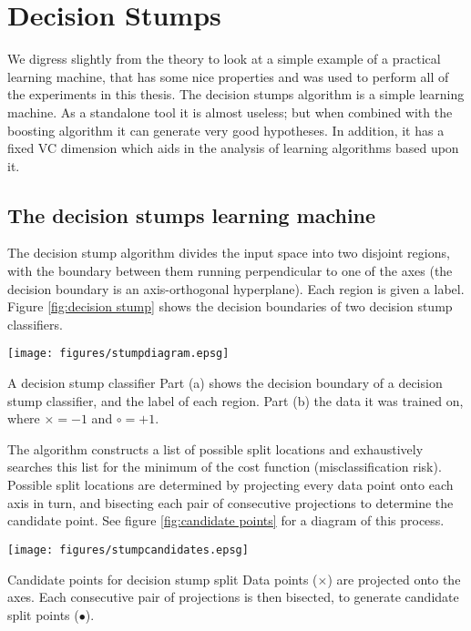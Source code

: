 
\chapter{Decision Stumps}
\label{chapter:stumps}

We digress slightly from the theory to look at a simple example of a
practical learning machine, that has some nice properties and was used
to perform all of the experiments in this thesis.
The decision stumps algorithm is a simple learning
machine.  As a standalone tool it is almost useless; but when
combined with the boosting algorithm it can generate very good
hypotheses.  In addition, it has a fixed VC dimension which aids in
the analysis of learning algorithms based upon it.

\section{The decision stumps learning machine}

The decision stump algorithm divides the input space
into two disjoint regions, with the boundary between them running
perpendicular to one of the axes (the decision boundary is an
axis-orthogonal hyperplane).  Each region is given a label.
Figure \ref{fig:decision stump} shows the decision boundaries of two
decision stump classifiers.

\begin{linefigure}
\begin{center}
\texttt{[image: figures/stumpdiagram.epsg]}
\end{center}
\begin{capt}{A decision stump classifier}
Part (a) shows the decision boundary of a decision stump classifier,
and the label of each region.  Part (b) the data it was trained on,
where $\times = -1$ and $\circ = +1$.
\end{capt}
\label{fig:decision stump}
\end{linefigure}

The algorithm constructs a list of possible split locations and
exhaustively searches this list for the minimum of the cost function
(misclassification risk).  Possible split locations are determined by
projecting every data point onto each axis in turn, and bisecting each
pair of consecutive projections to determine the candidate point.  See
figure \ref{fig:candidate points} for a diagram of this process.

\begin{linefigure}
\begin{center}
\texttt{[image: figures/stumpcandidates.epsg]}
\end{center}
\begin{capt}{Candidate points for decision stump split}
Data points ($\times$) are projected onto the axes.  Each consecutive
pair of projections is then bisected, to generate candidate split
points ($\bullet$).
\end{capt}
\label{fig:candidate points}
\end{linefigure}


